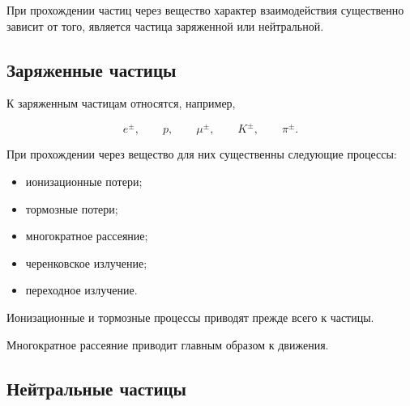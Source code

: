 \documentclass[../final.tex]{subfiles}
\begin{document}





При прохождении частиц через вещество характер взаимодействия
существенно зависит от того, является частица заряженной
или нейтральной.


\subsection*{Заряженные частицы}

К заряженным частицам относятся, например,

\begin{equation*}
    e^\pm,
    \qquad
    p,
    \qquad
    \mu^\pm,
    \qquad
    K^\pm,
    \qquad
    \pi^\pm.
\end{equation*}

При прохождении через вещество для них существенны следующие процессы:

\begin{itemize}
    \item ионизационные потери;
    \item тормозные потери;
    \item многократное рассеяние;
    \item черенковское излучение;
    \item переходное излучение.
\end{itemize}

Ионизационные и тормозные процессы приводят прежде всего
к  частицы.

Многократное рассеяние приводит главным образом к
 движения.


\subsection*{Нейтральные частицы}
\end{document}
